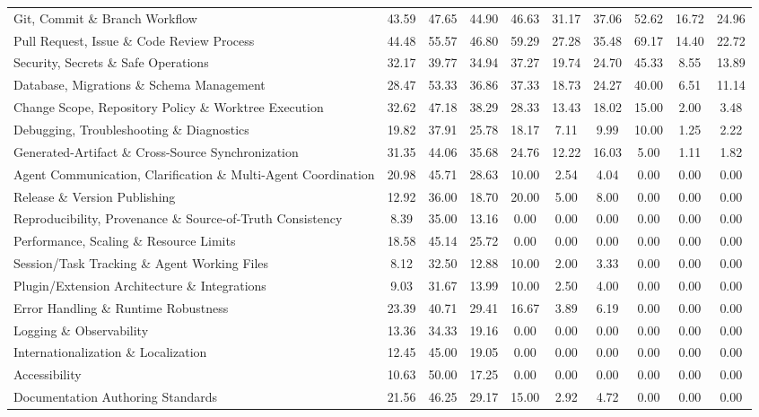 {\begin{longtable}{l ccc ccc ccc}
Git, Commit \& Branch Workflow & 43.59 & 47.65 & 44.90 & 46.63 & 31.17 & 37.06 & 52.62 & 16.72 & 24.96 \\
Pull Request, Issue \& Code Review Process & 44.48 & 55.57 & 46.80 & 59.29 & 27.28 & 35.48 & 69.17 & 14.40 & 22.72 \\
Security, Secrets \& Safe Operations & 32.17 & 39.77 & 34.94 & 37.27 & 19.74 & 24.70 & 45.33 & 8.55 & 13.89 \\
Database, Migrations \& Schema Management & 28.47 & 53.33 & 36.86 & 37.33 & 18.73 & 24.27 & 40.00 & 6.51 & 11.14 \\
Change Scope, Repository Policy \& Worktree Execution & 32.62 & 47.18 & 38.29 & 28.33 & 13.43 & 18.02 & 15.00 & 2.00 & 3.48 \\
Debugging, Troubleshooting \& Diagnostics & 19.82 & 37.91 & 25.78 & 18.17 & 7.11 & 9.99 & 10.00 & 1.25 & 2.22 \\
Generated-Artifact \& Cross-Source Synchronization & 31.35 & 44.06 & 35.68 & 24.76 & 12.22 & 16.03 & 5.00 & 1.11 & 1.82 \\
Agent Communication, Clarification \& Multi-Agent Coordination & 20.98 & 45.71 & 28.63 & 10.00 & 2.54 & 4.04 & 0.00 & 0.00 & 0.00 \\
Release \& Version Publishing & 12.92 & 36.00 & 18.70 & 20.00 & 5.00 & 8.00 & 0.00 & 0.00 & 0.00 \\
Reproducibility, Provenance \& Source-of-Truth Consistency & 8.39 & 35.00 & 13.16 & 0.00 & 0.00 & 0.00 & 0.00 & 0.00 & 0.00 \\
Performance, Scaling \& Resource Limits & 18.58 & 45.14 & 25.72 & 0.00 & 0.00 & 0.00 & 0.00 & 0.00 & 0.00 \\
Session/Task Tracking \& Agent Working Files & 8.12 & 32.50 & 12.88 & 10.00 & 2.00 & 3.33 & 0.00 & 0.00 & 0.00 \\
Plugin/Extension Architecture \& Integrations & 9.03 & 31.67 & 13.99 & 10.00 & 2.50 & 4.00 & 0.00 & 0.00 & 0.00 \\
Error Handling \& Runtime Robustness & 23.39 & 40.71 & 29.41 & 16.67 & 3.89 & 6.19 & 0.00 & 0.00 & 0.00 \\
Logging \& Observability & 13.36 & 34.33 & 19.16 & 0.00 & 0.00 & 0.00 & 0.00 & 0.00 & 0.00 \\
Internationalization \& Localization & 12.45 & 45.00 & 19.05 & 0.00 & 0.00 & 0.00 & 0.00 & 0.00 & 0.00 \\
Accessibility & 10.63 & 50.00 & 17.25 & 0.00 & 0.00 & 0.00 & 0.00 & 0.00 & 0.00 \\
Documentation Authoring Standards & 21.56 & 46.25 & 29.17 & 15.00 & 2.92 & 4.72 & 0.00 & 0.00 & 0.00 \\

\end{longtable}}
